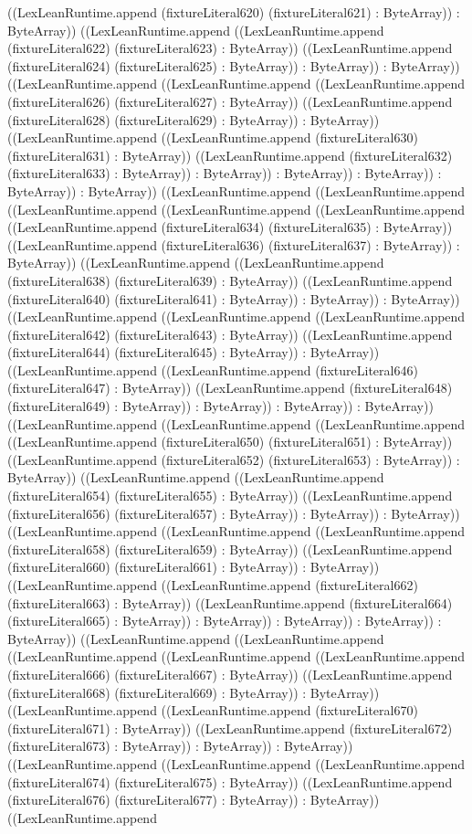 \documentclass[11pt]{article}
\begin{document}
((LexLeanRuntime.append (fixtureLiteral620) (fixtureLiteral621) : ByteArray)) : ByteArray)) ((LexLeanRuntime.append ((LexLeanRuntime.append (fixtureLiteral622) (fixtureLiteral623) : ByteArray)) ((LexLeanRuntime.append (fixtureLiteral624) (fixtureLiteral625) : ByteArray)) : ByteArray)) : ByteArray)) ((LexLeanRuntime.append ((LexLeanRuntime.append ((LexLeanRuntime.append (fixtureLiteral626) (fixtureLiteral627) : ByteArray)) ((LexLeanRuntime.append (fixtureLiteral628) (fixtureLiteral629) : ByteArray)) : ByteArray)) ((LexLeanRuntime.append ((LexLeanRuntime.append (fixtureLiteral630) (fixtureLiteral631) : ByteArray)) ((LexLeanRuntime.append (fixtureLiteral632) (fixtureLiteral633) : ByteArray)) : ByteArray)) : ByteArray)) : ByteArray)) : ByteArray)) : ByteArray)) ((LexLeanRuntime.append ((LexLeanRuntime.append ((LexLeanRuntime.append ((LexLeanRuntime.append ((LexLeanRuntime.append ((LexLeanRuntime.append (fixtureLiteral634) (fixtureLiteral635) : ByteArray)) ((LexLeanRuntime.append (fixtureLiteral636) (fixtureLiteral637) : ByteArray)) : ByteArray)) ((LexLeanRuntime.append ((LexLeanRuntime.append (fixtureLiteral638) (fixtureLiteral639) : ByteArray)) ((LexLeanRuntime.append (fixtureLiteral640) (fixtureLiteral641) : ByteArray)) : ByteArray)) : ByteArray)) ((LexLeanRuntime.append ((LexLeanRuntime.append ((LexLeanRuntime.append (fixtureLiteral642) (fixtureLiteral643) : ByteArray)) ((LexLeanRuntime.append (fixtureLiteral644) (fixtureLiteral645) : ByteArray)) : ByteArray)) ((LexLeanRuntime.append ((LexLeanRuntime.append (fixtureLiteral646) (fixtureLiteral647) : ByteArray)) ((LexLeanRuntime.append (fixtureLiteral648) (fixtureLiteral649) : ByteArray)) : ByteArray)) : ByteArray)) : ByteArray)) ((LexLeanRuntime.append ((LexLeanRuntime.append ((LexLeanRuntime.append ((LexLeanRuntime.append (fixtureLiteral650) (fixtureLiteral651) : ByteArray)) ((LexLeanRuntime.append (fixtureLiteral652) (fixtureLiteral653) : ByteArray)) : ByteArray)) ((LexLeanRuntime.append ((LexLeanRuntime.append (fixtureLiteral654) (fixtureLiteral655) : ByteArray)) ((LexLeanRuntime.append (fixtureLiteral656) (fixtureLiteral657) : ByteArray)) : ByteArray)) : ByteArray)) ((LexLeanRuntime.append ((LexLeanRuntime.append ((LexLeanRuntime.append (fixtureLiteral658) (fixtureLiteral659) : ByteArray)) ((LexLeanRuntime.append (fixtureLiteral660) (fixtureLiteral661) : ByteArray)) : ByteArray)) ((LexLeanRuntime.append ((LexLeanRuntime.append (fixtureLiteral662) (fixtureLiteral663) : ByteArray)) ((LexLeanRuntime.append (fixtureLiteral664) (fixtureLiteral665) : ByteArray)) : ByteArray)) : ByteArray)) : ByteArray)) : ByteArray)) ((LexLeanRuntime.append ((LexLeanRuntime.append ((LexLeanRuntime.append ((LexLeanRuntime.append ((LexLeanRuntime.append (fixtureLiteral666) (fixtureLiteral667) : ByteArray)) ((LexLeanRuntime.append (fixtureLiteral668) (fixtureLiteral669) : ByteArray)) : ByteArray)) ((LexLeanRuntime.append ((LexLeanRuntime.append (fixtureLiteral670) (fixtureLiteral671) : ByteArray)) ((LexLeanRuntime.append (fixtureLiteral672) (fixtureLiteral673) : ByteArray)) : ByteArray)) : ByteArray)) ((LexLeanRuntime.append ((LexLeanRuntime.append ((LexLeanRuntime.append (fixtureLiteral674) (fixtureLiteral675) : ByteArray)) ((LexLeanRuntime.append (fixtureLiteral676) (fixtureLiteral677) : ByteArray)) : ByteArray)) ((LexLeanRuntime.append 
\end{document}
